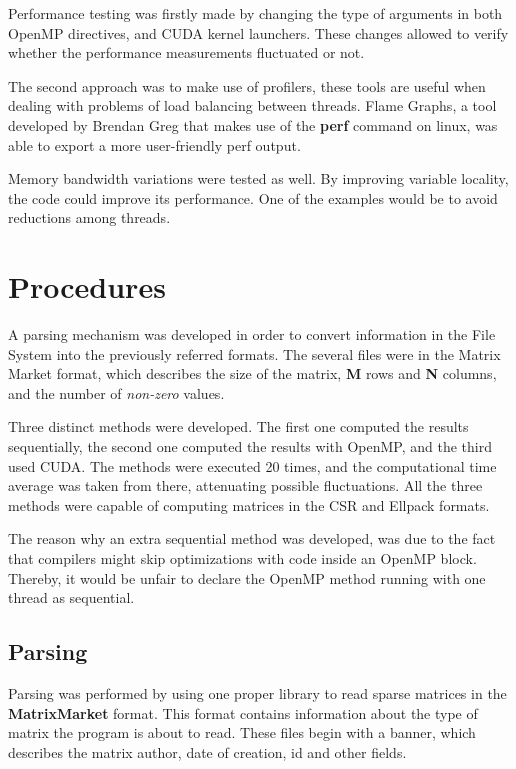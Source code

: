 \documentclass[12pt]{article}
\begin{document}
\par Performance testing was firstly made by changing the type of arguments in both OpenMP directives, and CUDA kernel launchers. These changes allowed to verify whether the performance measurements fluctuated or not. 
\par The second approach was to make use of profilers, these tools are useful when dealing with problems of load balancing between threads. Flame Graphs, a tool developed by Brendan Greg that makes use of the \textbf{perf} command on linux, was able to export a more user-friendly perf output\cite{flame-graphs}. 
\par Memory bandwidth variations were tested as well. By improving variable locality, the code could improve its performance. One of the examples would be to avoid reductions among threads. 

\section*{Procedures}
\par A parsing mechanism was developed in order to convert information in the File System into the previously referred formats. The several files were in the Matrix Market format, which describes the size of the matrix, \textbf{M} rows and \textbf{N} columns, and the number of \textit{non-zero} values. 
\par Three distinct methods were developed. The first one computed the results sequentially, the second one computed the results with OpenMP, and the third used CUDA. The methods were executed 20 times, and the computational time average was taken from there, attenuating possible fluctuations. All the three methods were capable of computing matrices in the CSR and Ellpack formats. 
\par The reason why an extra sequential method was developed, was due to the fact that compilers might skip optimizations with code inside an OpenMP block. Thereby, it would be unfair to declare the OpenMP method running with one thread as sequential.

\subsection*{Parsing}

\par Parsing was performed by using one proper library to read sparse matrices in the \textbf{MatrixMarket} format. This format contains information about the type of matrix the program is about to read. These files begin with a banner, which describes the matrix author, date of creation, id and other fields.
\end{document}
